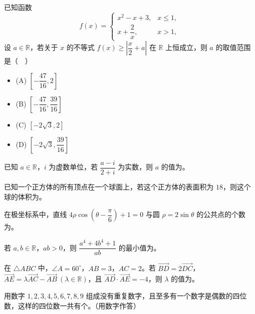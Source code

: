 \begin{question}
已知函数
\nopagebreak[4]
\[
f(x)=
\begin{cases}
x^2-x+3,&x\leqslant1,\\
x+\dfrac2x,&x>1,
\end{cases}
\]
设 $a\in\mathbb R$，若关于 $x$ 的不等式 $f(x)\geqslant\left|\dfrac x2+a\right|$ 在 $\mathbb R$ 上恒成立，则 $a$ 的取值范围是（　）

\begin{itemize}
\item (A) $\left[-\dfrac{47}{16},2\right]$
\item (B) $\left[-\dfrac{47}{16},\dfrac{39}{16}\right]$
\item (C) $[-2\sqrt3,2]$
\item (D) $\left[-2\sqrt3,\dfrac{39}{16}\right]$
\end{itemize}

\end{question}

\begin{question}
已知 $a\in\mathbb R$，$i$ 为虚数单位，若 $\dfrac{a-i}{2+i}$ 为实数，则 $a$ 的值为\gkblank{}。

\end{question}
\begin{question}
已知一个正方体的所有顶点在一个球面上，若这个正方体的表面积为 $18$，则这个球的体积为\gkblank{}。

\end{question}
\begin{question}
在极坐标系中，直线 $4\rho\cos\left(\theta-\dfrac\pi6\right)+1=0$ 与圆 $\rho=2\sin\theta$ 的公共点的个数为\gkblank{}。

\end{question}
\begin{question}
若 $a,b\in\mathbb R$，$ab>0$，则 $\dfrac{a^4+4b^4+1}{ab}$ 的最小值为\gkblank{}。

\end{question}
\begin{question}
在 $\triangle ABC$ 中，$\angle A=60^\circ$，$AB=3$，$AC=2$。若 $\overrightarrow{BD}=2\overrightarrow{DC}$，$\overrightarrow{AE}=\lambda\overrightarrow{AC}-\overrightarrow{AB}\ (\lambda\in\mathbb R)$，且 $\overrightarrow{AD}\cdot\overrightarrow{AE}=-4$，则 $\lambda$ 的值为\gkblank{}。

\end{question}
\begin{question}
用数字 $1,2,3,4,5,6,7,8,9$ 组成没有重复数字，且至多有一个数字是偶数的四位数，这样的四位数一共有\gkblank{}个。（用数字作答）

\end{question}

